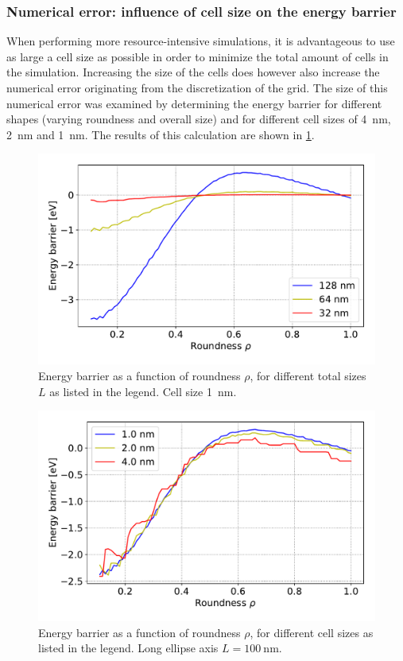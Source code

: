 \documentclass[11pt,a4paper,english]{article}
\begin{document}
\subsubsection{Numerical error: influence of cell size on the energy barrier}
When performing more resource-intensive simulations, it is advantageous to use as large a cell size as possible in order to minimize the total amount of cells in the simulation. Increasing the size of the cells does however also increase the numerical error originating from the discretization of the grid. The size of this numerical error was examined by determining the energy barrier for different shapes (varying roundness and overall size) and for different cell sizes of \SI{4}{\nano\metre}, \SI{2}{\nano\metre} and \SI{1}{\nano\metre}. The results of this calculation are shown in \cref{fig:barrier-cell_size}.
\begin{figure}
    \centering
    \includegraphics[width=0.9\columnwidth]{Figures/biaxial_island/Barrier/Plus_32-128_0.1-1_aPi4_B0.001_cell1nm.pdf}
    \caption{Energy barrier as a function of roundness $\rho$, for different total sizes $L$ as listed in the legend. Cell size \SI{1}{\nano\metre}.}
    \label{fig:barrier-cell_size}
\end{figure}
\begin{figure}
    \centering
    \includegraphics[width=0.9\columnwidth]{Figures/biaxial_island/Barrier/Plus_100_0.1-1_aPi4_B0.001.pdf}
    \caption{Energy barrier as a function of roundness $\rho$, for different cell sizes as listed in the legend. Long ellipse axis $L=\SI{100}{\nano\metre}$.}
    \label{fig:barrier-cell_size-100nm}
\end{figure}
\end{document}
